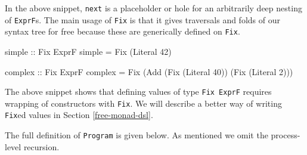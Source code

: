 \documentclass[runningheads,plain]{llncs}
\newenvironment{Shaded}{}{}
\newcommand{\DataTypeTok}[1]{\textcolor[rgb]{0.56,0.13,0.00}{#1}}
\newcommand{\DecValTok}[1]{\textcolor[rgb]{0.25,0.63,0.44}{#1}}
\newcommand{\OtherTok}[1]{\textcolor[rgb]{0.00,0.44,0.13}{#1}}
\newcommand{\FunctionTok}[1]{\textcolor[rgb]{0.02,0.16,0.49}{#1}}
\newcommand{\NormalTok}[1]{#1}
\begin{document}
In the above snippet, \texttt{next} is a placeholder or hole for an
arbitrarily deep nesting of \texttt{ExprF}s. The main usage of
\texttt{Fix} is that it gives traversals and folds of our syntax tree
for free because these are generically defined on \texttt{Fix}.

\begin{Shaded}
\begin{Highlighting}[]
\OtherTok{simple ::} \DataTypeTok{Fix} \DataTypeTok{ExprF}
\NormalTok{simple }\FunctionTok{=} \DataTypeTok{Fix}\NormalTok{ (}\DataTypeTok{Literal} \DecValTok{42}\NormalTok{)}

\OtherTok{complex ::} \DataTypeTok{Fix} \DataTypeTok{ExprF}
\NormalTok{complex }\FunctionTok{=} 
    \DataTypeTok{Fix}\NormalTok{ (}\DataTypeTok{Add}\NormalTok{ (}\DataTypeTok{Fix}\NormalTok{ (}\DataTypeTok{Literal} \DecValTok{40}\NormalTok{)) (}\DataTypeTok{Fix}\NormalTok{ (}\DataTypeTok{Literal} \DecValTok{2}\NormalTok{)))}
\end{Highlighting}
\end{Shaded}

The above snippet shows that defining values of type \texttt{Fix\ ExprF}
requires wrapping of constructors with \texttt{Fix}. We will describe a
better way of writing \texttt{Fix}ed values in Section
\ref{free-monad-dsl}.

The full definition of \texttt{Program} is given below. As mentioned we
omit the process-level recursion.
\end{document}
